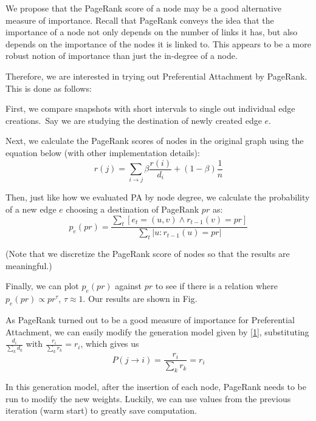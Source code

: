\documentclass[10pt]{article}
\begin{document}
\begin{multicols}{2}
We propose that the PageRank score of a node may be a good alternative measure of importance. Recall that PageRank conveys the idea that the importance of a node not only depends on the number of links it has, but also depends on the importance of the nodes it is linked to. This appears to be a more robust notion of importance than just the in-degree of a node.

Therefore, we are interested in trying out Preferential Attachment by PageRank. This is done as follows:

First, we compare snapshots with short intervals to single out individual edge creations.~Say we are studying the destination of newly created edge $e$.

Next, we calculate the PageRank scores of nodes in the original graph using the equation below (with other implementation details):
\begin{equation}
\label{3}
r(j)=\sum\limits_{i\rightarrow j}\beta\frac{r(i)}{d_i}+(1-\beta)\frac{1}{n}
\end{equation}

Then, just like how we evaluated PA by node degree, we calculate the probability of a new edge $e$ choosing a destination of PageRank $pr$ as:
\begin{equation}
\label{4}
p_e(pr)=\frac{\sum\limits_{t}[e_t=(u,v)\wedge r_{t-1}(v)=pr]}{\sum\limits_{t}|u:r_{t-1}(u)=pr|}
\end{equation}

(Note that we discretize the PageRank score of nodes so that the results are meaningful.)

Finally, we can plot $p_e(pr)$ against $pr$ to see if there is a relation where $p_e(pr)\propto pr^\tau$, $\tau \approx 1$. Our results are shown in Fig.






As PageRank turned out to be a good measure of importance for Preferential Attachment, we can easily modify the generation model given by \eqref{1}, substituting $\frac{d_i}{\sum\limits_{k}d_k}$ with $\frac{r_i}{\sum\limits_{k}r_k}=r_i$, which gives us
\begin{equation}
\label{5}
P(j\rightarrow i)=\frac{r_i}{\sum\limits_{k}r_k}=r_i
\end{equation}

In this generation model, after the insertion of each node, PageRank needs to be run to modify the new weights. Luckily, we can use values from the previous iteration (warm start) to greatly save computation.


\end{multicols}
\end{document}
